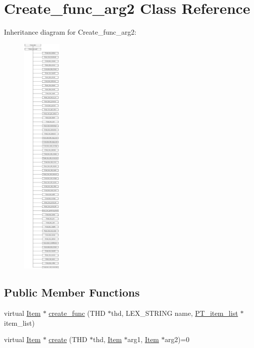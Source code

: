 \hypertarget{classCreate__func__arg2}{}\section{Create\+\_\+func\+\_\+arg2 Class Reference}
\label{classCreate__func__arg2}
Inheritance diagram for Create\+\_\+func\+\_\+arg2\+:\begin{figure}[H]
\begin{center}
\leavevmode
\includegraphics[height=12.000000cm]{classCreate__func__arg2}
\end{center}
\end{figure}
\subsection*{Public Member Functions}
\begin{DoxyCompactItemize}
\item 
virtual \mbox{\hyperlink{classItem}{Item}} $\ast$ \mbox{\hyperlink{classCreate__func__arg2_af00a3acb69525f4aee007ef21ca43e30}{create\+\_\+func}} (T\+HD $\ast$thd, L\+E\+X\+\_\+\+S\+T\+R\+I\+NG name, \mbox{\hyperlink{classPT__item__list}{P\+T\+\_\+item\+\_\+list}} $\ast$item\+\_\+list)
\item 
virtual \mbox{\hyperlink{classItem}{Item}} $\ast$ \mbox{\hyperlink{classCreate__func__arg2_a76060a72cbb2328a6ed32389e7641aee}{create}} (T\+HD $\ast$thd, \mbox{\hyperlink{classItem}{Item}} $\ast$arg1, \mbox{\hyperlink{classItem}{Item}} $\ast$arg2)=0
\end{DoxyCompactItemize}
